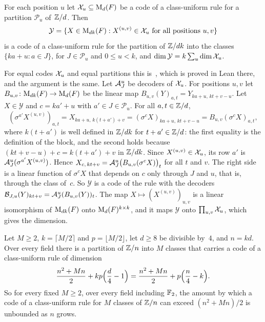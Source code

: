 \begin{lemma}\label{lem:mixed-blowup}
\notformalized
For each position $u$ let $\mathcal{X}_u\subseteq\mathrm{M}_d(F)$ be a code of a class-uniform rule for a partition $\mathcal P_u$
of~$\mathbb{Z}/d$. Then
\[
  \mathcal Y=\{X\in\mathrm{M}_{dk}(F):X^{(u,v)}\in\mathcal{X}_u\text{ for all positions }u,v\}
\]
is a code of a class-uniform rule for the partition of $\mathbb{Z}/dk$ into the classes $\{ka+u:a\in J\}$, for
$J\in\mathcal P_u$ and $0\le u<k$, and $\dim\mathcal Y=k\sum_u\dim\mathcal{X}_u$.
\end{lemma}

\begin{informalproof}
For equal codes $\mathcal{X}_u$ and equal partitions this is~\cite[Theorem~4.2]{ClassUniformMemo2026}, which is proved in Lean
there, and the
argument is the same. Let $\mathcal{A}^u_J$ be decoders of $\mathcal{X}_u$. For positions $u,v$ let
$B_{u,v}\colon\mathrm{M}_{dk}(F)\to\mathrm{M}_d(F)$ be the linear map $B_{u,v}(Y)_{a,t}=Y_{ka+u,\,kt+v-u}$. Let $X\in\mathcal Y$
and $c=ka'+u$ with $a'\in J\in\mathcal P_u$. For all $a,t\in\mathbb{Z}/d$,
\[
  (\sigma^{a'}X^{(u,v)})_{a,t}=X_{ka+u,\,k(t+a')+v}=(\sigma^cX)_{ka+u,\,kt+v-u}=B_{u,v}(\sigma^cX)_{a,t},
\]
where $k(t+a')$ is well defined in $\mathbb{Z}/dk$ for $t+a'\in\mathbb{Z}/d$: the first equality is the definition of the block, and
the second holds because $(kt+v-u)+c=k(t+a')+v$ in $\mathbb{Z}/dk$. Since $X^{(u,v)}\in\mathcal{X}_u$, its row $a'$ is $\mathcal{A}^u_J(\sigma^{a'}X^{(u,v)})$.
Hence $X_{c,\,kt+v}=\mathcal{A}^u_J\bigl(B_{u,v}(\sigma^cX)\bigr)_t$ for all $t$ and $v$. The right side is a linear function
of $\sigma^cX$ that depends on $c$ only through $J$ and $u$, that is, through the class of~$c$. So $\mathcal Y$ is a
code of the rule with the decoders $\mathcal B_{J,u}(Y)_{kt+v}=\mathcal{A}^u_J(B_{u,v}(Y))_t$. The map
$X\mapsto(X^{(u,v)})_{u,v}$ is a linear isomorphism of $\mathrm{M}_{dk}(F)$ onto $\mathrm{M}_d(F)^{k\times k}$, and it maps
$\mathcal Y$ onto $\prod_{u,v}\mathcal{X}_u$, which gives the dimension.
\end{informalproof}

\begin{corollary}\label{cor:every-M}
\notformalized
Let $M\ge2$, $k=\lceil M/2\rceil$ and $p=\lfloor M/2\rfloor$, let $d\ge8$ be divisible by~$4$, and $n=kd$. Over every
field there is a partition of $\mathbb{Z}/n$ into $M$ classes that carries a code of a class-uniform rule of dimension
\[
  \frac{n^2+Mn}2+kp\Bigl(\frac d4-1\Bigr)=\frac{n^2+Mn}2+p\Bigl(\frac n4-k\Bigr).
\]
So for every fixed $M\ge2$, over every field including $\mathbb{F}_2$, the amount by which a code of a class-uniform rule for
$M$ classes of $\mathbb{Z}/n$ can exceed $(n^2+Mn)/2$ is unbounded as $n$ grows.
\end{corollary}

